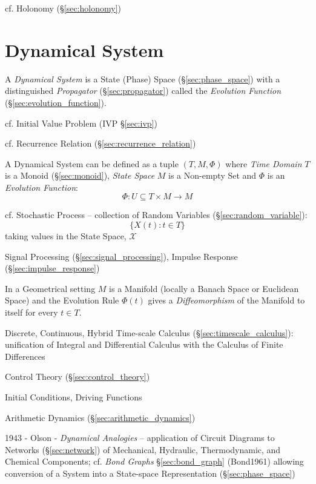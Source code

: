 cf. Holonomy (\S\ref{sec:holonomy})



\section{Dynamical System}\label{sec:dynamical_system}

A \emph{Dynamical System} is a State (Phase) Space (\S\ref{sec:phase_space})
with a distinguished \emph{Propagator} (\S\ref{sec:propagator}) called the
\emph{Evolution Function} (\S\ref{sec:evolution_function}).

\fist cf. Initial Value Problem (IVP \S\ref{sec:ivp})

\fist cf. Recurrence Relation (\S\ref{sec:recurrence_relation})

A Dynamical System can be defined as a tuple $(T,M,\Phi)$ where \emph{Time
  Domain} $T$ is a Monoid (\S\ref{sec:monoid}), \emph{State Space} $M$ is a
Non-empty Set and $\Phi$ is an \emph{Evolution Function}:
\[
  \Phi : U \subseteq T \times M \rightarrow M
\]

\fist cf. Stochastic Process -- collection of Random Variables
(\S\ref{sec:random_variable}):
\[
  \{ X(t) : t \in T \}
\]
taking values in the State Space, $\mathcal{X}$

\fist Signal Processing (\S\ref{sec:signal_processing}), Impulse Response
(\S\ref{sec:impulse_response})

In a Geometrical setting $M$ is a Manifold (locally a Banach Space or Euclidean
Space) and the Evolution Rule $\Phi(t)$ gives a \emph{Diffeomorphism} of the
Manifold to itself for every $t \in T$. %

Discrete, Continuous, Hybrid \fist Time-scale Calculus
(\S\ref{sec:timescale_calculus}): unification of Integral and Differential
Calculus with the Calculus of Finite Differences

Control Theory (\S\ref{sec:control_theory})

Initial Conditions, Driving Functions


Arithmetic Dynamics (\S\ref{sec:arithmetic_dynamics})

1943 - Olson - \emph{Dynamical Analogies} -- application of Circuit Diagrams to
Networks (\S\ref{sec:network}) of Mechanical, Hydraulic, Thermodynamic, and
Chemical Components; cf. \emph{Bond Graphs} \S\ref{sec:bond_graph} (Bond1961)
allowing conversion of a System into a State-space Representation
(\S\ref{sec:phase_space})

